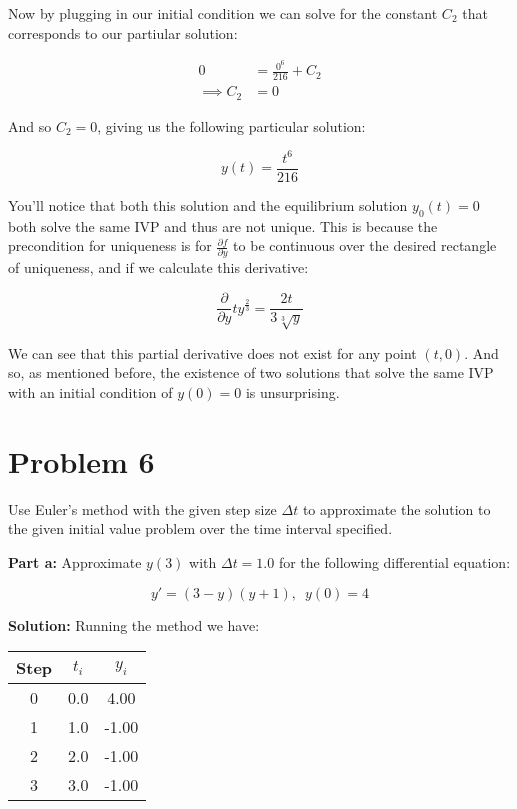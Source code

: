 \documentclass{article}
\begin{document}
Now by plugging in our initial condition we can solve for the constant $C_2$ that corresponds to our partiular solution:

\begin{align*}
    0&=\frac{0^6}{216}+C_2\tag{$(t,y)=(0,0)$}\\
    \implies C_2&=0
\end{align*}

And so $C_2=0$, giving us the following particular solution:

\begin{equation*}
    y(t)=\frac{t^6}{216}
\end{equation*}

You'll notice that both this solution and the equilibrium solution $y_0(t)=0$ both solve the same IVP and thus are not unique. This is because the precondition for uniqueness is for $\frac{\partial f}{\partial y}$ to be continuous over the desired rectangle of uniqueness, and if we calculate this derivative:

\begin{equation*}
    \frac{\partial}{\partial y}ty^{\frac{2}{3}}=\frac{2t}{3\sqrt[3]{y}}
\end{equation*}

We can see that this partial derivative does not exist for any point $(t,0)$. And so, as mentioned before, the existence of two solutions that solve the same IVP with an initial condition of $y(0)=0$ is unsurprising.

\section*{Problem 6}
Use Euler’s method with the given step size $\Delta t$ to approximate the solution to the given initial value problem over the time interval specified.
\bigskip

\noindent\textbf{Part a:} Approximate $y(3)$ with $\Delta t=1.0$ for the following differential equation:

\begin{equation*}
    y'=(3-y)(y+1),\,\,\,y(0)=4
\end{equation*}
\smallskip

\noindent\textbf{Solution:} Running the method we have:

\begin{center}
\begin{tabular}{c|c|c}
        Step & $t_i$ & $y_i$\\
        \hline
        0 & 0.0 & 4.00\\
        1 & 1.0 & -1.00\\
        2 & 2.0 & -1.00\\
        3 & 3.0 & -1.00\\
\end{tabular}
\end{center}
\end{document}
